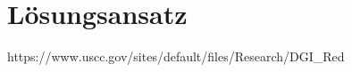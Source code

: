 \chapter{Lösungsansatz}
\label{ch:loesungsansatz}


https://www.uscc.gov/sites/default/files/Research/DGI_Red%